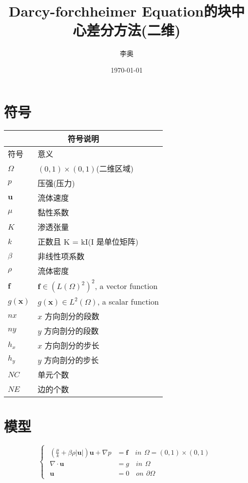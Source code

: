 \documentclass[leqno]{article}
\begin{document}
\title{Darcy-forchheimer Equation的块中心差分方法(二维)}
\author{李奥}
\date{\today}
\maketitle
\tableofcontents
\newpage
\section{符号}
\begin{tabular}{ |l|l| }   
\hline   
\multicolumn{2}{|c|}{符号说明} \\  
\hline
符号 & 意义 \\
\hline
$\Omega$ & $(0,1)\times(0,1)$(二维区域) \\
\hline
$p$ & 压强(压力) \\
\hline
$\boldsymbol{u}$ & 流体速度 \\
\hline
$\mu$ & 黏性系数 \\
\hline
$K$ & 渗透张量 \\
\hline
$k$ & 正数且 K = kI(I 是单位矩阵) \\
\hline 
$\beta$ & 非线性项系数 \\
\hline
$\rho$ & 流体密度 \\
\hline
$\boldsymbol{f}$ & $\boldsymbol{f} \in (L(\Omega)^2)^2$, a vector function\\
\hline
$g(\boldsymbol{x})$ & $g(\boldsymbol{x}) \in L^2(\Omega)$, a scalar function \\
\hline 
$nx$ & $x$ 方向剖分的段数 \\
\hline
$ny$ & $y$ 方向剖分的段数 \\
\hline
$h_x$ & $x$ 方向剖分的步长 \\
\hline
$h_y$ & $y$ 方向剖分的步长 \\
\hline
$NC$ & 单元个数 \\
\hline
$NE$ & 边的个数 \\
\hline
\end{tabular}

\section{模型}
\begin{equation*}
\begin{cases}
\begin{aligned}
(\frac{\mu}{k} + \beta\rho|\boldsymbol{u}|)\boldsymbol{u} + \nabla p & = \boldsymbol{f} \quad in \,\ \Omega = (0,1)\times (0,1) \\
\nabla \cdot \boldsymbol{u} & = g \quad in \,\ \Omega \\
\boldsymbol {u} & = 0 \quad on \,\ \partial \Omega
\end{aligned}
\end{cases}
\end{equation*}
\end{document}

